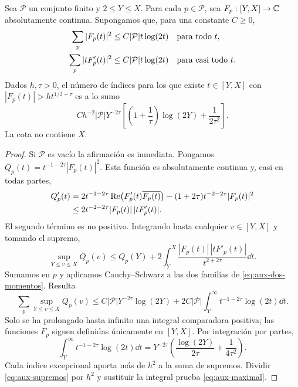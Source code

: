 \begin{lema}
\label{lem:aux-maximal}
Sea $\mathcal P$ un conjunto finito y $2\le Y\le X$.
Para cada $p\in\mathcal P$, sea $F_p:[Y,X]\to\mathbb{C}$
absolutamente continua. Supongamos que, para una constante $C\ge0$,
\begin{align}
 \sum_p|F_p(t)|^2&\le C|\mathcal P|t\log(2t)
                         &&\text{para todo }t,\notag\\
 \sum_p|tF'_p(t)|^2&\le C|\mathcal P|t\log(2t)
                         &&\text{para casi todo }t.
 \label{eq:aux-dos-momentos}
\end{align}
Dados $h,\tau>0$, el número de índices para los que existe
$t\in[Y,X]$ con $|F_p(t)|>ht^{1/2+\tau}$ es a lo sumo
\begin{equation}
 C h^{-2}|\mathcal P|Y^{-2\tau}
 \left[\left(1+\frac1\tau\right)\log(2Y)
                         +\frac1{2\tau^2}\right].
 \label{eq:aux-maximal}
\end{equation}
La cota no contiene $X$.
\end{lema}

\begin{proof}
Si $\mathcal P$ es vacío la afirmación es inmediata.
Pongamos $Q_p(t)=t^{-1-2\tau}|F_p(t)|^2$.
Esta función es absolutamente continua y, casi en todas partes,
\begin{align*}
 Q'_p(t)
 &=2t^{-1-2\tau}\operatorname{Re}\bigl(F'_p(t)\overline{F_p(t)}\bigr)
       -(1+2\tau)t^{-2-2\tau}|F_p(t)|^2\\
 &\le2t^{-2-2\tau}|F_p(t)|\,|tF'_p(t)|.
\end{align*}
El segundo término es no positivo. Integrando hasta cualquier
$v\in[Y,X]$ y tomando el supremo,
\[
 \sup_{Y\le v\le X}Q_p(v)
 \le Q_p(Y)+2\int_Y^X
             \frac{|F_p(t)|\,|tF'_p(t)|}{t^{2+2\tau}}\dd t.
\]
Sumamos en $p$ y aplicamos Cauchy--Schwarz a las dos familias de
\eqref{eq:aux-dos-momentos}. Resulta
\begin{equation}
 \sum_p\sup_{Y\le v\le X}Q_p(v)
 \le C|\mathcal P|Y^{-2\tau}\log(2Y)
       +2C|\mathcal P|\int_Y^\infty
                    t^{-1-2\tau}\log(2t)\dd t.
 \label{eq:aux-supremos}
\end{equation}
Solo se ha prolongado hasta infinito una integral comparadora positiva;
las funciones $F_p$ siguen definidas únicamente en $[Y,X]$.
Por integración por partes,
\begin{equation}
 \int_Y^\infty t^{-1-2\tau}\log(2t)\dd t
 =Y^{-2\tau}\left(\frac{\log(2Y)}{2\tau}
                                     +\frac1{4\tau^2}\right).
 \label{eq:aux-integral-maximal}
\end{equation}
Cada índice excepcional aporta más de $h^2$ a la suma de supremos.
Dividir \eqref{eq:aux-supremos} por $h^2$ y sustituir la integral
prueba \eqref{eq:aux-maximal}.
\end{proof}

